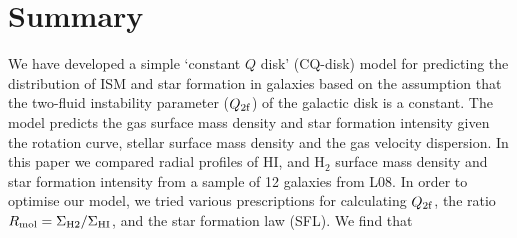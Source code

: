 \documentclass[12pt,preprint]{aastex}
\begin{document}
\section{Summary}
\label{conclusion}
We have developed a simple `constant $Q$ disk'   (CQ-disk)  model for predicting the distribution of ISM and star
formation in galaxies based on the assumption that the two-fluid instability parameter ($Q_{\rm 2f}$) of the galactic disk is a constant. The model predicts  the gas surface mass density and star formation intensity given the rotation curve, stellar surface mass density and the gas velocity dispersion. 
In this paper we compared radial profiles of HI, and H$_2$ surface mass density and star formation intensity from a sample of 12 galaxies from L08.  In order to optimise our model, we tried various prescriptions for calculating $Q_{\rm 2f}$, the ratio $R_{\rm mol} = \Sigma_{\rm H2}/\Sigma_{\rm HI}$, and the star formation law (SFL).
We find that 
\end{document}
